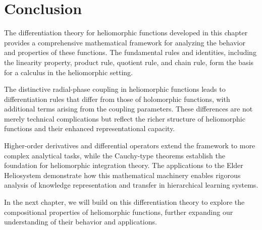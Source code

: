 \section{Conclusion}

The differentiation theory for heliomorphic functions developed in this chapter provides a comprehensive mathematical framework for analyzing the behavior and properties of these functions. The fundamental rules and identities, including the linearity property, product rule, quotient rule, and chain rule, form the basis for a calculus in the heliomorphic setting.

The distinctive radial-phase coupling in heliomorphic functions leads to differentiation rules that differ from those of holomorphic functions, with additional terms arising from the coupling parameters. These differences are not merely technical complications but reflect the richer structure of heliomorphic functions and their enhanced representational capacity.

Higher-order derivatives and differential operators extend the framework to more complex analytical tasks, while the Cauchy-type theorems establish the foundation for heliomorphic integration theory. The applications to the Elder Heliosystem demonstrate how this mathematical machinery enables rigorous analysis of knowledge representation and transfer in hierarchical learning systems.

In the next chapter, we will build on this differentiation theory to explore the compositional properties of heliomorphic functions, further expanding our understanding of their behavior and applications.